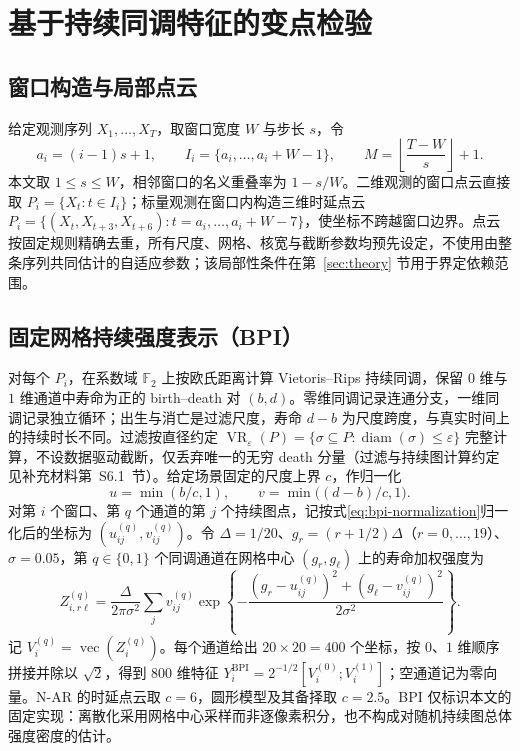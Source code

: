 \section{基于持续同调特征的变点检验}\label{sec:method}

\subsection{窗口构造与局部点云}\label{sec:windows}
给定观测序列 $X_1,\ldots,X_T$，取窗口宽度 $W$ 与步长 $s$，令
\begin{equation}\label{eq:windows}
 a_i=(i-1)s+1,\qquad
 I_i=\{a_i,\ldots,a_i+W-1\},\qquad
 M=\left\lfloor\frac{T-W}{s}\right\rfloor+1 .
\end{equation}
本文取 $1\le s\le W$，相邻窗口的名义重叠率为 $1-s/W$。二维观测的窗口点云直接取 $P_i=\{X_t:t\in I_i\}$；标量观测在窗口内构造三维时延点云 $P_i=\{(X_t,X_{t+3},X_{t+6}):t=a_i,\ldots,a_i+W-7\}$，使坐标不跨越窗口边界。点云按固定规则精确去重，所有尺度、网格、核宽与截断参数均预先设定，不使用由整条序列共同估计的自适应参数；该局部性条件在第~\ref{sec:theory} 节用于界定依赖范围。

\subsection{固定网格持续强度表示（BPI）}\label{sec:bpi}
对每个 $P_i$，在系数域 $\mathbb F_2$ 上按欧氏距离计算 Vietoris--Rips 持续同调\cite{Bauer2021}，保留 $0$ 维与 $1$ 维通道中寿命为正的 birth--death 对 $(b,d)$。零维同调记录连通分支，一维同调记录独立循环；出生与消亡是过滤尺度，寿命 $d-b$ 为尺度跨度，与真实时间上的持续时长不同。过滤按直径约定 $\operatorname{VR}_\varepsilon(P)=\{\sigma\subseteq P:\operatorname{diam}(\sigma)\le\varepsilon\}$ 完整计算，不设数据驱动截断，仅丢弃唯一的无穷 death 分量（过滤与持续图计算约定见补充材料第~S6.1~节）。给定场景固定的尺度上界 $c$，作归一化
\begin{equation}\label{eq:bpi-normalization}
 u=\min(b/c,1),\qquad v=\min\bigl((d-b)/c,1\bigr).
\end{equation}
对第 $i$ 个窗口、第 $q$ 个通道的第 $j$ 个持续图点，记按式\eqref{eq:bpi-normalization}归一化后的坐标为 $(u_{ij}^{(q)},v_{ij}^{(q)})$。令 $\Delta=1/20$、$g_r=(r+1/2)\Delta$（$r=0,\ldots,19$）、$\sigma=0.05$，第 $q\in\{0,1\}$ 个同调通道在网格中心 $(g_r,g_\ell)$ 上的寿命加权强度为
\begin{equation}\label{eq:bpi}
 Z_{i,r\ell}^{(q)}
 =\frac{\Delta}{2\pi\sigma^2}\sum_j v_{ij}^{(q)}
 \exp\left\{-\frac{(g_r-u_{ij}^{(q)})^2+(g_\ell-v_{ij}^{(q)})^2}{2\sigma^2}\right\}.
\end{equation}
记 $V_i^{(q)}=\operatorname{vec}(Z_i^{(q)})$。每个通道给出 $20\times20=400$ 个坐标，按 $0$、$1$ 维顺序拼接并除以 $\sqrt2$，得到 800 维特征 $Y_i^{\mathrm{BPI}}=2^{-1/2}[V_i^{(0)};V_i^{(1)}]$；空通道记为零向量。N-AR 的时延点云取 $c=6$，圆形模型及其备择取 $c=2.5$。BPI 仅标识本文的固定实现：离散化采用网格中心采样而非逐像素积分，也不构成对随机持续图总体强度密度的估计。


